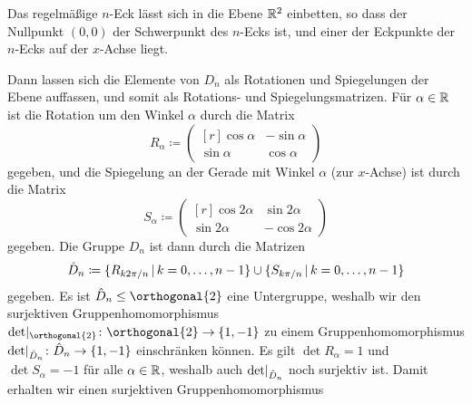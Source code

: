Das regelmäßige $n$-Eck lässt sich in die Ebene $\mathbb{R}^2$ einbetten, so dass der Nullpunkt $(0,0)$ der Schwerpunkt des $n$-Ecks ist, und einer der Eckpunkte der $n$-Ecks auf der $x$-Achse liegt.
\begin{center}
\end{center}
Dann lassen sich die Elemente von $D_n$ als Rotationen und Spiegelungen der Ebene auffassen, und somit als Rotations- und Spiegelungsmatrizen.
Für $\alpha \in \mathbb{R}$ ist die Rotation um den Winkel $\alpha$ durch die Matrix
\[
            R_\alpha
  \coloneqq \begin{pmatrix*}[r]
              \cos \alpha & -\sin \alpha  \\
              \sin \alpha &  \cos \alpha
            \end{pmatrix*}
\]
gegeben, und die Spiegelung an der Gerade mit Winkel $\alpha$ (zur $x$-Achse) ist durch die Matrix
\[
            S_\alpha
  \coloneqq \begin{pmatrix*}[r]
              \cos 2\alpha  &  \sin 2\alpha \\
              \sin 2\alpha  & -\cos 2\alpha
            \end{pmatrix*}
\]
gegeben.
Die Gruppe $D_n$ ist dann durch die Matrizen
\[
            \hat{D}_n
  \coloneqq \{
              R_{k 2\pi/n}
            \suchthat
              k = 0, \dotsc, n-1
            \}
            \cup
            \{
              S_{k \pi/n}
            \suchthat
              k = 0, \dotsc, n-1
            \}
\]
gegeben.
Es ist $\hat{D}_n \subgroup \orthogonal{2}$ eine Untergruppe, weshalb wir den surjektiven Gruppenhomomorphismus $\restrict{\det}{\orthogonal{2}} \colon \orthogonal{2} \to \{1, -1\}$ zu einem Gruppenhomomorphismus $\restrict{\det}{\hat{D}_n} \colon \hat{D}_n \to \{1,-1\}$ einschränken können.
Es gilt $\det R_\alpha = 1$ und $\det S_\alpha = -1$ für alle $\alpha \in \mathbb{R}$, weshalb auch $\restrict{\det}{\hat{D}_n}$ noch surjektiv ist.
Damit erhalten wir einen surjektiven Gruppenhomomorphismus
